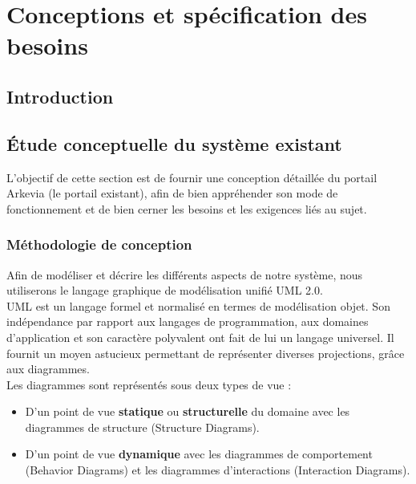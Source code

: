 \section{Conceptions et spécification des besoins}
\subsection*{Introduction}
\subsection{Étude conceptuelle du système existant}
L'objectif de cette section est de fournir une conception détaillée du portail Arkevia (le portail existant), afin de bien appréhender son mode de fonctionnement et de bien cerner les besoins et les exigences liés au sujet.
\subsubsection{Méthodologie de conception}
Afin de modéliser et décrire les différents aspects de notre système, nous utiliserons le langage
graphique de modélisation unifié UML 2.0.\\
UML est un langage formel et normalisé en termes de modélisation objet. Son indépendance par rapport aux langages de programmation, aux domaines d’application et son caractère polyvalent ont fait de lui un langage universel. Il fournit un moyen astucieux permettant de représenter diverses projections, grâce aux diagrammes.\\
Les diagrammes sont représentés sous deux types de vue :
\begin{itemize}
    \item D'un point de vue \textbf{statique} ou \textbf{structurelle} du domaine avec les diagrammes de structure (Structure Diagrams).
    \item D'un point de vue \textbf{dynamique} avec les diagrammes de comportement (Behavior Diagrams) et les diagrammes d’interactions (Interaction Diagrams).\\
\end{itemize}

